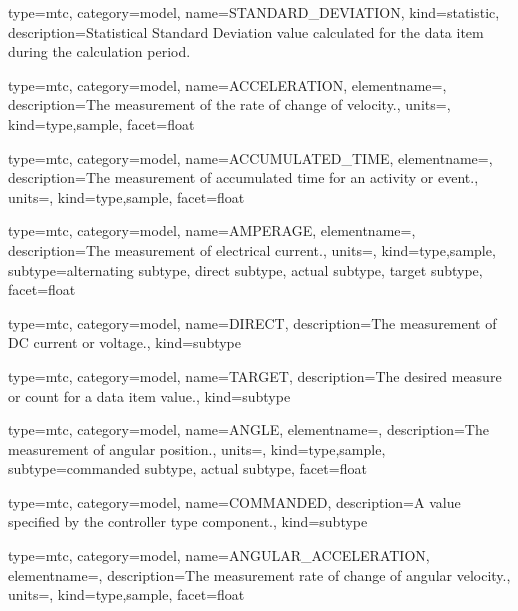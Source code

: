 {
  type=mtc,
  category=model,
  name={STANDARD\_DEVIATION},
  kind={statistic},
  description={Statistical Standard Deviation value calculated for the data item during the calculation period.}
}


{
  type=mtc,
  category=model,
  name={ACCELERATION},
  elementname=,
  description={The measurement of the rate of change of velocity.},
  units=,
  kind={type,sample},
  facet={\gls{float}}
}


{
  type=mtc,
  category=model,
  name={ACCUMULATED\_TIME},
  elementname=,
  description={The measurement of accumulated time for an activity or event.},
  units=,
  kind={type,sample},
  facet={\gls{float}}
}


{
  type=mtc,
  category=model,
  name={AMPERAGE},
  elementname=,
  description={The measurement of electrical current.},
  units=,
  kind={type,sample},
  subtype={\gls{alternating subtype}, \gls{direct subtype}, \gls{actual subtype}, \gls{target subtype}},
  facet={\gls{float}}
}



{
  type=mtc,
  category=model,
  name={DIRECT},
  description={The measurement of DC current or voltage.},
  kind={subtype}
}


{
  type=mtc,
  category=model,
  name={TARGET},
  description={The desired measure or count for a data item value.},
  kind={subtype}
}


{
  type=mtc,
  category=model,
  name={ANGLE},
  elementname=,
  description={The measurement of angular position.},
  units=,
  kind={type,sample},
  subtype={\gls{commanded subtype}, \gls{actual subtype}},
  facet={\gls{float}}
}


{
  type=mtc,
  category=model,
  name={COMMANDED},
  description={A value specified by the \gls{controller} type component.},
  kind={subtype}
}


{
  type=mtc,
  category=model,
  name={ANGULAR\_ACCELERATION},
  elementname=,
  description={The measurement rate of change of angular velocity.},
  units=,
  kind={type,sample},
  facet={\gls{float}}
}


